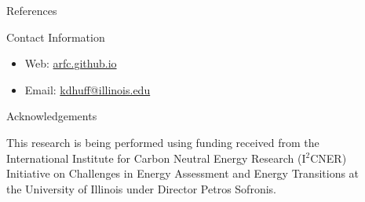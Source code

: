 \documentclass[final]{beamer}
\newlength{\sepwid}
\newlength{\onecolwid}
\newlength{\twocolwid}
\newlength{\threecolwid}
\begin{document}
\begin{frame}[t]
\begin{columns}[t,totalwidth=\threecolwid]
\begin{column}{\twocolwid}
        
\end{column} %

\begin{column}{\sepwid}\end{column} %

\begin{column}{\onecolwid} %

\begin{block}{References}
        {\footnotesize 
        }
\end{block}



\begin{alertblock}{Contact Information}
\begin{itemize}
	\item Web: \href{arfc.github.io}{arfc.github.io}
	\item Email: \href{mailto:kdhuff@illinois.edu}{kdhuff@illinois.edu}
\end{itemize}

\end{alertblock}



\begin{block}{Acknowledgements}

This research is being performed using funding received
from the International Institute for Carbon Neutral Energy Research (I$^2$CNER) 
Initiative on Challenges in Energy Assessment and Energy Transitions at  the  
University of Illinois under Director Petros Sofronis.


\end{block}
\end{column}
\end{columns}
\end{frame}
\end{document}
